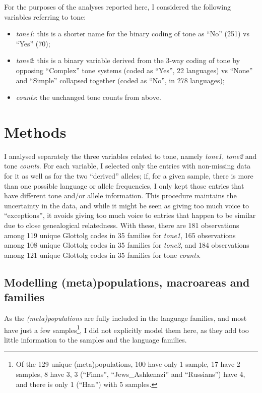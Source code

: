 \documentclass[twoside,onecolumn]{article}
\begin{document}
For the purposes of the analyses reported here, I considered the following variables referring to tone:

\begin{itemize}
  \item \emph{tone1}: this is a shorter name for the binary coding of tone as ``No'' (251) vs ``Yes'' (70);
  \item \emph{tone2}: this is a binary variable derived from the 3-way coding of tone by opposing ``Complex'' tone systems (coded as ``Yes'', 22 languages) vs ``None'' and ``Simple'' collapsed together (coded as ``No'', in 278 languages);
  \item \emph{counts}: the unchanged tone counts from above.
\end{itemize}




\section{Methods}

I analysed separately the three variables related to tone, namely \textit{tone1}, \textit{tone2} and tone \textit{counts}.
For each variable, I selected only the entries with non-missing data for it as well as for the two ``derived'' alleles; if, for a given sample, there is more than one possible language or allele frequencies, I only kept those entries that have different tone and/or allele information.
This procedure maintains the uncertainty in the data, and while it might be seen as giving too much voice to ``exceptions'', it avoids giving too much voice to entries that happen to be similar due to close genealogical relatedness.
With these, there are 181 observations among 119 unique Glottolg codes in 35 families for \textit{tone1}, 165 observations among 108 unique Glottolg codes in 35 families for \textit{tone2}, and 184 observations among 121 unique Glottolg codes in 35 families for tone \textit{counts}.


\subsection{Modelling (meta)populations, macroareas and families}

As the \emph{(meta)populations} are fully included in the language families, and most have just a few samples\footnote{Of the 129 unique (meta)populations, 100 have only 1 sample, 17 have 2 samples, 8 have 3, 3 (``Finns'', ``Jews\_Ashkenazi'' and ``Russians'') have 4, and there is only 1 (``Han'') with 5 samples.}, I did not explicitly model them here, as they add too little information to the samples and the language families.
\end{document}
